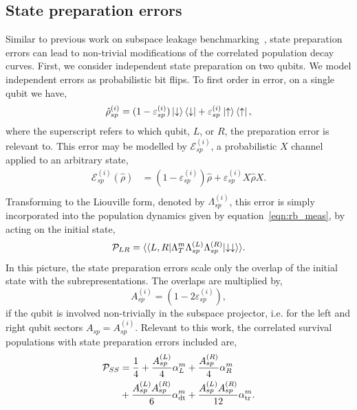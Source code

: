 \subsection{State preparation errors}\label{app:spam}
Similar to previous work on subspace leakage benchmarking~\cite{sutherland_subspace_2025}, state preparation errors can lead to non-trivial modifications of the correlated population decay curves. 
First, we consider independent state preparation on two qubits. We model independent errors as probabilistic bit flips. To first order in error, on a single qubit we have,
\begin{equation}
\label{eqn:state_prep}
\begin{split}
    \hat\rho_{sp}^{(i)}&=(1-\varepsilon_{sp}^{(i)})\ket{\downarrow}\bra{\downarrow}+\varepsilon_{sp}^{(i)}\ket{\uparrow}\bra{\uparrow},\\
\end{split}
\end{equation}
where the superscript refers to which qubit, $L$, or $R$, the preparation error is relevant to.
This error may be modelled by $\mathcal{E}_{sp}^{(i)}$, a probabilistic $X$ channel applied to an arbitrary state,
\begin{equation}
\label{eqn:app_state_prep}
\begin{split}
    \mathcal{E}_{sp}^{(i)}(\hat\rho)&=\left(1-\varepsilon_{sp}^{(i)}\right)\hat\rho+\varepsilon_{sp}^{(i)}X\hat\rho X.\\
\end{split}
\end{equation}
Transforming to the Liouville form, denoted by $\Lambda_{sp}^{(i)}$, this error is simply
incorporated into the population dynamics given by equation~\ref{eqn:rb_meas}, by acting on the initial state,
\begin{equation}
    \mathcal{P}_{LR}=\langle\langle L,R\lvert\Lambda_T^m\Lambda_{sp}^{(L)}\Lambda_{sp}^{(R)}\lvert\downarrow\downarrow\rangle\rangle.
\end{equation}
In this picture, the state preparation errors scale only the overlap of the initial state with the subrepresentations. 
The overlaps are multiplied by,
\begin{equation}
    A_{sp}^{(i)}=(1-2\varepsilon_{sp}^{(i)}),
\end{equation}
if the qubit is involved non-trivially in the subspace projector, i.e. for the left and right qubit sectors $A_{sp}=A_{sp}^{(i)}$.
Relevant to this work, the correlated survival populations with state preparation errors included are,
\begin{equation}
\label{eqn:app_pop_sp}
\begin{split}
    \mathcal{P}_{SS} &=  \frac{1}{4}+\frac{A_{sp}^{(L)}}{4}\alpha_L^m+\frac{A_{sp}^{(R)}}{4}\alpha_R^m \\
    &+ \frac{A_{sp}^{(L)}A_{sp}^{(R)}}{6}\alpha_{\rm dt}^m+\frac{A_{sp}^{(L)}A_{sp}^{(R)}}{12}\alpha_{\rm tr}^m.
\end{split}
\end{equation}

